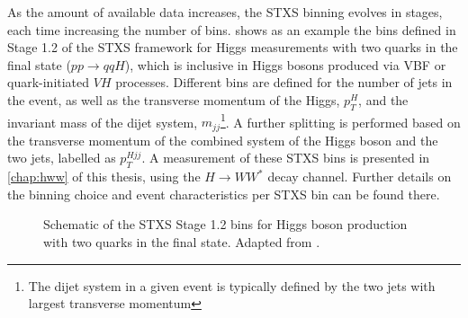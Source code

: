 As the amount of available data increases, the STXS binning evolves in stages, each time increasing the number of bins. 
 shows as an example the bins defined in Stage 1.2 of the STXS framework for Higgs measurements with two quarks in the final state ($pp \to qqH$), which is inclusive in Higgs bosons produced via VBF or quark-initiated $VH$ processes. 
Different bins are defined for the number of jets in the event, as well as the transverse momentum of the Higgs, $p_T^{H}$, and the invariant mass of the dijet system, $m_{jj}$\footnote{The dijet system in a given event is typically defined by the two jets with largest transverse momentum}. A further splitting is performed based on the transverse momentum of the combined system of the Higgs boson and the two jets, labelled as $p_T^{Hjj}$. 
A measurement of these STXS bins is presented in \cref{chap:hww} of this thesis, using the $H \to WW^*$ decay channel. Further details on the binning choice and event characteristics per STXS bin can be found there.

\begin{figure}
  \caption{Schematic of the STXS Stage 1.2 bins for Higgs boson production with two quarks in the final state. Adapted from .}
  \label{fig:stxs-stage12}
\end{figure}




